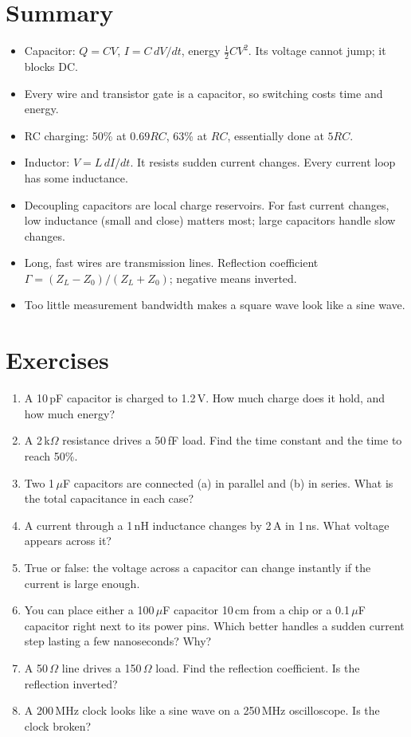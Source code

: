 \section{Summary}

\begin{itemize}
  \item Capacitor: $Q = CV$, $I = C\,dV/dt$, energy $\tfrac12CV^2$. Its voltage cannot jump; it blocks DC.
  \item Every wire and transistor gate is a capacitor, so switching costs time and energy.
  \item RC charging: 50\% at $0.69RC$, 63\% at $RC$, essentially done at $5RC$.
  \item Inductor: $V = L\,dI/dt$. It resists sudden current changes. Every current loop has some inductance.
  \item Decoupling capacitors are local charge reservoirs. For fast current changes, low inductance (small and close) matters most; large capacitors handle slow changes.
  \item Long, fast wires are transmission lines. Reflection coefficient $\Gamma = (Z_L - Z_0)/(Z_L + Z_0)$; negative means inverted.
  \item Too little measurement bandwidth makes a square wave look like a sine wave.
\end{itemize}

\section{Exercises}

\begin{enumerate}
  \item A 10\,pF capacitor is charged to 1.2\,V. How much charge does it hold, and how much energy?
  \item A 2\,k$\Omega$ resistance drives a 50\,fF load. Find the time constant and the time to reach 50\%.
  \item Two 1\,$\mu$F capacitors are connected (a) in parallel and (b) in series. What is the total capacitance in each case?
  \item A current through a 1\,nH inductance changes by 2\,A in 1\,ns. What voltage appears across it?
  \item True or false: the voltage across a capacitor can change instantly if the current is large enough.
  \item You can place either a 100\,$\mu$F capacitor 10\,cm from a chip or a 0.1\,$\mu$F capacitor right next to its power pins. Which better handles a sudden current step lasting a few nanoseconds? Why?
  \item A 50\,$\Omega$ line drives a 150\,$\Omega$ load. Find the reflection coefficient. Is the reflection inverted?
  \item A 200\,MHz clock looks like a sine wave on a 250\,MHz oscilloscope. Is the clock broken?
\end{enumerate}

